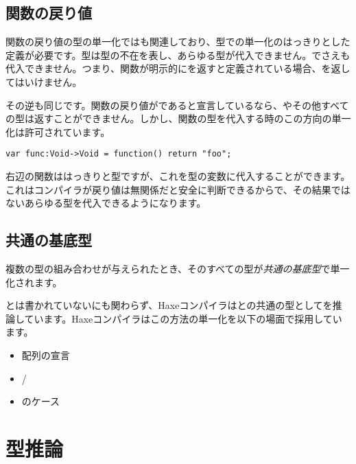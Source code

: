 \subsection{関数の戻り値}
\label{type-system-unification-function-return}

関数の戻り値の型の単一化ではも関連しており、型での単一化のはっきりとした定義が必要です。型は型の不在を表し、あらゆる型が代入できません。でさえも代入できません。つまり、関数が明示的にを返すと定義されている場合、を返してはいけません。

その逆も同じです。関数の戻り値がであると宣言しているなら、やその他すべての型は返すことができません。しかし、関数の型を代入する時のこの方向の単一化は許可されています。

\begin{lstlisting}
var func:Void->Void = function() return "foo";
\end{lstlisting}

右辺の関数ははっきりと型ですが、これを型の変数に代入することができます。これはコンパイラが戻り値は無関係だと安全に判断できるからで、その結果ではないあらゆる型を代入できるようになります。

\subsection{共通の基底型}
\label{type-system-unification-common-base-type}

複数の型の組み合わせが与えられたとき、そのすべての型が\emph{共通の基底型}で単一化されます。


とは書かれていないにも関わらず、Haxeコンパイラはとの共通の型としてを推論しています。Haxeコンパイラはこの方法の単一化を以下の場面で採用しています。

\begin{itemize}
	\item 配列の宣言
	\item {}/
	\item {}のケース
\end{itemize}


\section{型推論}
\label{type-system-type-inference}

